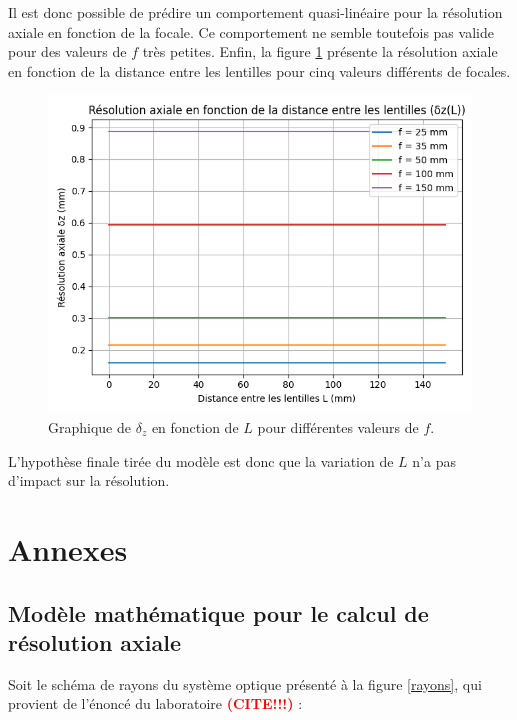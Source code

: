 \documentclass[11pt,letterpaper]{article}
\begin{document}
Il est donc possible de prédire un comportement quasi-linéaire pour la résolution axiale en fonction de la focale. Ce comportement ne semble toutefois pas valide pour des valeurs de $f$ très petites. Enfin, la figure \ref{resl} présente la résolution axiale en fonction de la distance entre les lentilles pour cinq valeurs différents de focales. 

\begin{figure}[H]
  \centering
  \includegraphics[scale=0.7]{res_vs_L.png}
  \caption{Graphique de $\delta_{z}$ en fonction de $L$ pour différentes valeurs de $f$.}
  \label{resl}
\end{figure}

L'hypothèse finale tirée du modèle est donc que la variation de $L$ n'a pas d'impact sur la résolution. 

\section{Annexes}

\subsection{Modèle mathématique pour le calcul de résolution axiale}
Soit le schéma de rayons du système optique présenté à la figure \ref{rayons}, qui provient de l'énoncé du laboratoire \textcolor{red}{\textbf{(CITE!!!)} } : 
\end{document}
